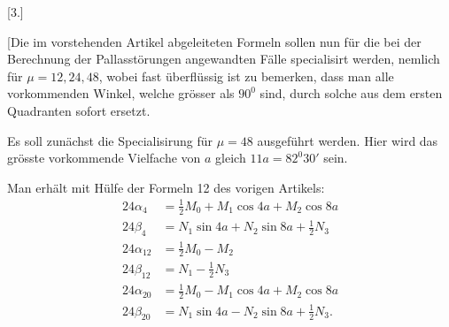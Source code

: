 \clearpage
\begin{landscape}
\begingroup
\fontsize{9.5}{12}\selectfont
{}
\renewcommand{\headrulewidth}{0pt}
\makeatletter\tagsleft@true\let\veqno\@@leqno\makeatother
\setlength{\lineskip}{4pt}\setlength{\lineskiplimit}{4pt}
\newcommand{\VthreeTerminalPair}{\mathord{\text{\makebox[.14em][l]{\raisebox{.75ex}{\rule{.055em}{.16ex}}\kern-.055em\raisebox{-.18ex}{,}}}}}
\newcommand{\VthreeRaisedPoint}{\mathord{\text{\raisebox{.5ex}{.}}}}
\newcommand{\VthreeLowDash}{\mathord{\text{\makebox[0pt][l]{\kern-.06em\raisebox{-.32ex}{\rule{.15em}{.045ex}}}}}}
\newcommand{\VthreeBrokenMark}{\mathord{\text{\makebox[.1em][l]{\raisebox{.8ex}{\rule{.055em}{.22ex}}\kern-.055em\raisebox{-.1ex}{\rule{.08em}{.5ex}}}}}}
\newcommand{\VthreeLowMark}{\mathord{\text{\makebox[0pt][l]{\kern-.1em\raisebox{-.65ex}{,}}}}}
\newcommand{\VthreeVerticalMark}{\mathord{\text{\makebox[.1em][l]{\raisebox{-.1ex}{\rule{.08em}{1.1ex}}}}}}
\begin{center}[3.]\end{center}
\par\noindent\hspace*{\parindent}[Die im vorstehenden Artikel abgeleiteten Formeln sollen nun für die bei der Berechnung der Pallasstörungen angewandten Fälle specialisirt werden, nemlich für \(\mu=12,24,48\), wobei fast überflüssig ist zu bemerken, dass man alle vorkommenden Winkel, welche grösser als \(90^0\) sind, durch solche aus dem ersten Quadranten sofort ersetzt.
\par\noindent\hspace*{\parindent}Es soll zunächst die Specialisirung für \(\mu=48\) ausgeführt werden. Hier wird das grösste vorkommende Vielfache von \(a\) gleich \(11a=82^0 30'\) sein.
\par\noindent\hspace*{\parindent}Man erhält mit Hülfe der Formeln 12 des vorigen Artikels:
\[
\tag*{1)}
\begin{aligned}
24\alpha_4&=\tfrac12 M_0+M_1\cos4a+M_2\cos8a\\
24\beta_4&=N_1\sin4a+N_2\sin8a+\tfrac12 N_3\\[4pt]
24\alpha_{12}&=\tfrac12 M_0-M_2\\
24\beta_{12}&=N_1-\tfrac12 N_3\\[4pt]
24\alpha_{20}&=\tfrac12 M_0-M_1\cos4a+M_2\cos8a\\
24\beta_{20}&=N_1\sin4a-N_2\sin8a+\tfrac12 N_3.

\end{aligned}\]
\end{landscape}
